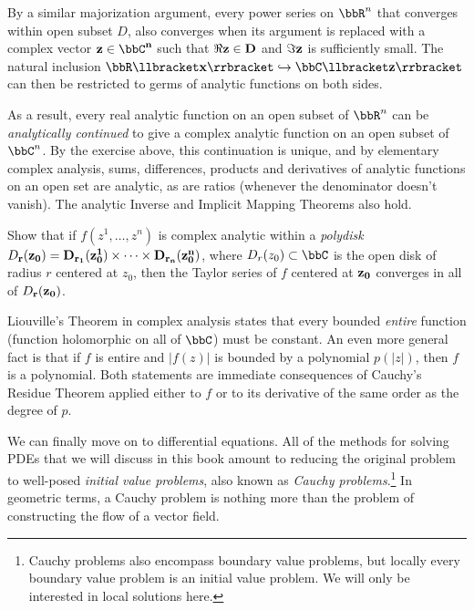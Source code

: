 By a similar majorization argument, every power series on $\bbR^n$ that converges within open subset $D$, also converges when its argument is replaced with a complex vector $\bf{z}\in\bbC^n$ such that $\Re \bf{z}\in D$ and $\Im\bf{z}$ is sufficiently small. The natural inclusion $\bbR\llbracket\bf{x}\rrbracket\hookrightarrow \bbC\llbracket\bf{z}\rrbracket$ can then be restricted to germs of analytic functions on both sides. 

As a result, every real analytic function on an open subset of $\bbR^n$ can be \emph{analytically continued} to give a complex analytic function on an open subset of $\bbC^n$. By the exercise above, this continuation is unique, and by elementary complex analysis, sums, differences, products and derivatives of analytic functions on an open set are analytic, as are ratios (whenever the denominator doesn't vanish). The analytic Inverse and Implicit Mapping Theorems also hold. 

\begin{xca}
    Show that if $f(z^1,\ldots,z^n)$ is complex analytic within a \emph{polydisk} $D_{\bf{r}}(\bf{z}_0)=D_{r_1}(z_0^1)\times\cdots \times D_{r_n}(z_0^n)$, where $D_r(z_0) \subset \bbC$ is the open disk of radius $r$ centered at $z_0$, then the Taylor series of $f$ centered at $\bf{z}_0$ converges in all of $D_{\bf{r}}(\bf{z}_0)$.
\end{xca}

\begin{example}
    Liouville's Theorem in complex analysis states that every bounded \emph{entire} function (function holomorphic on all of $\bbC$) must be constant. An even more general fact is that if $f$ is entire and $|f(z)|$ is bounded by a polynomial $p(|z|)$, then $f$ is a polynomial. Both statements are immediate consequences of Cauchy's Residue Theorem applied either to $f$ or to its derivative of the same order as the degree of $p$.
\end{example}


We can finally move on to differential equations. All of the methods for solving PDEs that we will discuss in this book amount to reducing the original problem to well-posed \emph{initial value problems}, also known as \emph{Cauchy problems}.\footnote{Cauchy problems also encompass boundary value problems, but locally every boundary value problem is an initial value problem. We will only be interested in local solutions here.} In geometric terms, a Cauchy problem is nothing more than the problem of constructing the flow of a vector field. 

